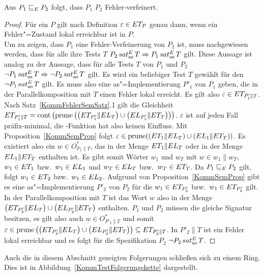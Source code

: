 \begin{Satz}
  \label{KommTestVerfSatz}
  Aus $P_1 \sqsubseteq  _E P_2$ folgt, dass $P_1$ $P_2$ Fehler-verfeinert.
\end{Satz}
\begin{proof}
  Für ein \MEIO{} $P$ gilt nach Definition $\varepsilon\in ET _P$ genau dann,
  wenn ein Fehler"=Zustand lokal erreichbar ist in $P$.\\
  Um zu zeigen, dass $P_1$ eine Fehler-Verfeinerung von $P_2$ ist, muss
  nachgewiesen werden, dass für alle ihre Tests $T$ $P_2\hspace{0.05cm}sat_\mathrm{as}^E\hspace{0.05cm} T \Rightarrow
  P_1\hspace{0.05cm}sat_\mathrm{as}^E\hspace{0.05cm} T$ gilt. Diese Aussage ist analog zu der Aussage, dass für alle
  Tests $T$ von $P_1$ und $P_2$ $\neg P_1\hspace{0.05cm}sat_\mathrm{as}^E\hspace{0.05cm} T \Rightarrow \neg P_2\hspace{0.05cm}sat_\mathrm{as}^E\hspace{0.05cm}
  T$ gilt. Es wird ein beliebiger Test $T$ gewählt für den $\neg P_1 \hspace{0.05cm}sat_\mathrm{as}^E\hspace{0.05cm} T$
  gilt. Es muss also eine as"=Implementierung $P'_1$ von $P_1$ geben, die in
  der Parallelkomposition mit $T$ einen Fehler lokal erreicht. Es gilt also
  $\varepsilon\in ET _{P'_1\|T}$. Nach Satz~\ref{KommFehlerSemSatz}.1 gilt die
  Gleichheit $ET _{P'_1\|T} = \mathrm{cont} \left(\mathrm{prune} \left(\left(ET _{P'_1}\|EL
  _T\right)\cup \left(EL _{P'_1}\|ET _T\right)\right)\right)$. $\varepsilon$
  ist auf jeden Fall präfix-minimal, die \cont{}-Funktion hat also keinen
  Einfluss. Mit Proposition~\ref{KommSemProp} folgt $\varepsilon \in \mathrm{prune}
  ((ET _1\|EL _T)\cup (EL _1\|ET _T))$. Es existiert also ein $w\in
  O_{P_1\|T}^*$, das in der Menge $ET _1\|EL _T$ oder in der Menge $EL
  _1\|ET _T$ enthalten ist. Es gibt somit Wörter $w_1$ und $w_T$ mit $w\in
  w_1\|w_T$, $w_1\in ET _1$ bzw.\ $w_1\in EL _1$ und $w_T\in EL _T$ bzw.\ $w_T
  \in ET _T$. Da $P_1 \sqsubseteq  _E P_2$ gilt, folgt $w_1\in ET _2$ bzw.\ $w_1\in EL
  _2$. Aufgrund von Proposition~\ref{KommSemProp} gibt es eine
  as"=Implementierung $P'_2$ von $P_2$ für die $w_1\in ET _{P'_2}$ bzw.\
  $w_1\in ET _{P'_2}$ gilt. In der Parallelkomposition mit $T$ ist das Wort $w$
  also in der Menge $\left(ET _{P'_2}\|EL _T\right)\cup \left(EL
  _{P'_2}\|ET _T\right)$ enthalten. $P_1$ und $P_2$ müssen die gleiche
  Signatur besitzen, es gilt also auch $w\in O_{P'_2\|T}^*$ und somit
  $\varepsilon\in\mathrm{prune} \left(\left(ET _{P'_2}\|EL _T\right)\cup \left(EL
  _{P'_2}\|ET _T\right)\right) \subseteq ET _{P'_2\|T}$. In $P'_2\|T$ ist ein
  Fehler lokal erreichbar und es folgt für die Spezifikation $P_2$ $\neg P_2 \hspace{0.05cm}sat_\mathrm{as}^E\hspace{0.05cm} T$.
\end{proof}

Auch die in diesem Abschnitt gezeigten Folgerungen schließen sich zu einem
Ring. Dies ist in Abbildung~\ref{KommTestFolgerungskette} dargestellt.

